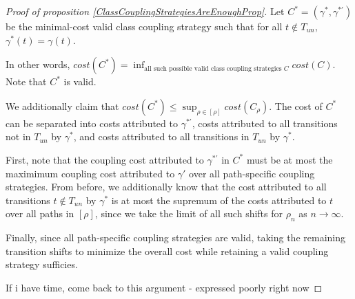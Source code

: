 \documentclass[12pt]{article}
\theoremstyle{definition}
\begin{document}
\begin{proof}[Proof of proposition \ref{ClassCouplingStrategiesAreEnoughProp}]
    Let $C^* = (\gamma^*, \gamma^{*\prime})$ be the minimal-cost valid class coupling strategy such that for all $t\notin T_{un}$, $\gamma^*(t) = \gamma(t)$. 

    In other words, $cost(C^*) = \inf_{\text{all such possible valid class coupling strategies } C} cost(C)$. Note that $C^*$ is valid. 

    We additionally claim that $cost(C^*)\leq \sup_{\rho\in [\rho]}cost(C_\rho)$. The cost of $C^*$ can be separated into costs attributed to $\gamma^{*\prime}$, costs attributed to all transitions not in $T_{un}$ by $\gamma^*$, and costs attributed to all transitions in $T_{un}$ by $\gamma^*$. 
    
    First, note that the coupling cost attributed to $\gamma^{*\prime}$ in $C^*$ must be at most the maximimum coupling cost attributed to $\gamma'$ over all path-specific coupling strategies. From before, we additionally know that the cost attributed to all transitions $t\notin T_{un}$ by $\gamma^*$ is at most the supremum of the costs attributed to $t$ over all paths in $[\rho]$, since we take the limit of all such shifts for $\rho_n$ as $n\to\infty$.

    Finally, since all path-specific coupling strategies are valid, taking the remaining transition shifts to minimize the overall cost while retaining a valid coupling strategy sufficies. 

    {\color{red} If i have time, come back to this argument - expressed poorly right now}
\end{proof}
\end{document}
